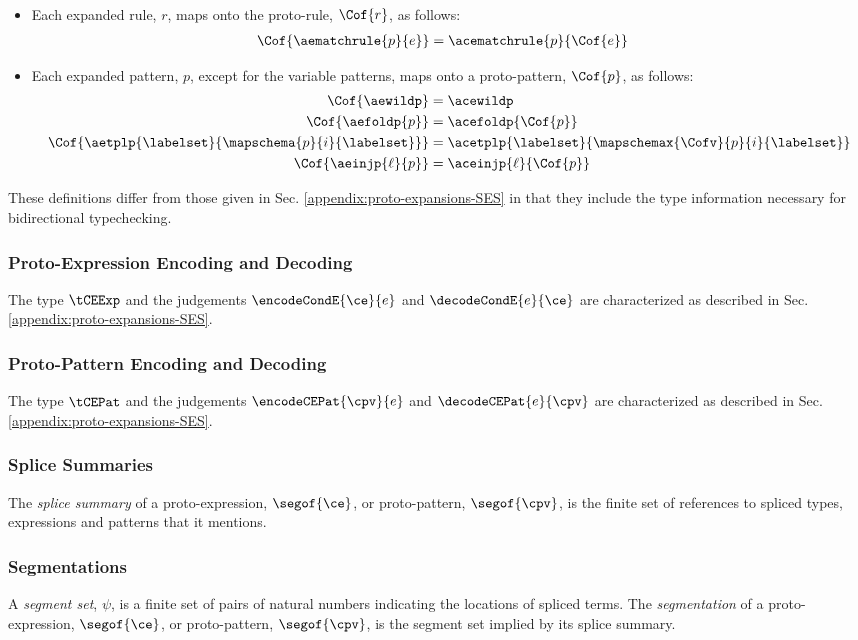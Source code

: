 \begin{itemize}
\[\begin{array}{rl}
  \end{array}\]
  \item Each expanded rule, $r$, maps onto the proto-rule, $\Cof{r}$, as follows:
  \begin{align*}
  \Cof{\aematchrule{p}{e}} & = \acematchrule{p}{\Cof{e}}
  \end{align*}
  \item Each expanded pattern, $p$, except for the variable patterns, maps onto a proto-pattern, $\Cof{p}$, as follows:
  \begin{align*}
  \Cof{\aewildp} & = \acewildp\\
  \Cof{\aefoldp{p}} & = \acefoldp{\Cof{p}}\\
  \Cof{\aetplp{\labelset}{\mapschema{p}{i}{\labelset}}} & = \acetplp{\labelset}{\mapschemax{\Cofv}{p}{i}{\labelset}}\\
  \Cof{\aeinjp{\ell}{p}} & = \aceinjp{\ell}{\Cof{p}}
  \end{align*}
\end{itemize}

These definitions differ from those given in Sec. \ref{appendix:proto-expansions-SES} in that they include the type information necessary for bidirectional typechecking.

\subsubsection{Proto-Expression Encoding and Decoding}
The type $\tCEExp$ and the judgements $\encodeCondE{\ce}{e}$ and $\decodeCondE{e}{\ce}$ are characterized as described in Sec. \ref{appendix:proto-expansions-SES}.

\subsubsection{Proto-Pattern Encoding and Decoding}
The type $\tCEPat$ and the judgements $\encodeCEPat{\cpv}{e}$ and $\decodeCEPat{e}{\cpv}$ are characterized as described in Sec. \ref{appendix:proto-expansions-SES}.

\subsubsection{Splice Summaries}
The \emph{splice summary} of a proto-expression, $\segof{\ce}$, or proto-pattern, $\segof{\cpv}$, is the finite set of references to spliced types, expressions {and patterns} that it mentions.

\subsubsection{Segmentations}
A \emph{segment set}, $\psi$, is a finite set of pairs of natural numbers indicating the locations of spliced terms. The \emph{segmentation} of a proto-expression, $\segof{\ce}$, or proto-pattern, $\segof{\cpv}$, is the segment set implied by its splice summary.


